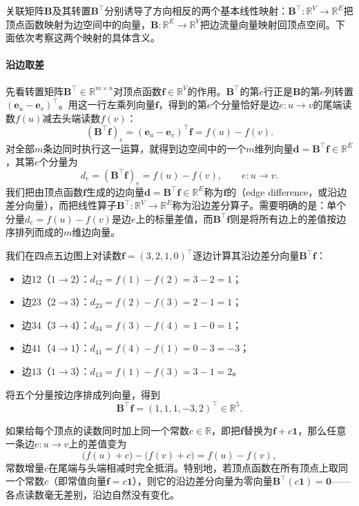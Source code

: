 关联矩阵$\bm{B}$及其转置$\bm{B}^\top$分别诱导了方向相反的两个基本线性映射：$\bm{B}^\top\colon\mathbb{R}^V\to\mathbb{R}^E$把顶点函数映射为边空间中的向量，$\bm{B}\colon\mathbb{R}^E\to\mathbb{R}^V$把边流量向量映射回顶点空间。下面依次考察这两个映射的具体含义。

\paragraph{沿边取差}

先看转置矩阵$\bm{B}^\top\in\mathbb{R}^{m\times n}$对顶点函数$\bm{f}\in\mathbb{R}^V$的作用。$\bm{B}^\top$的第$e$行正是$\bm{B}$的第$e$列转置$(\bm{e}_u-\bm{e}_v)^\top$。用这一行左乘列向量$\bm{f}$，得到的第$e$个分量恰好是边$e\colon u\to v$的尾端读数$f(u)$减去头端读数$f(v)$：
\[
(\bm{B}^\top\bm{f})_e=(\bm{e}_u-\bm{e}_v)^\top\bm{f}=f(u)-f(v).
\]
对全部$m$条边同时执行这一运算，就得到边空间中的一个$m$维列向量$\bm{d}=\bm{B}^\top\bm{f}\in\mathbb{R}^E$，其第$e$个分量为
\begin{equation}
d_e=(\bm{B}^\top\bm{f})_e=f(u)-f(v),\qquad e\colon u\to v.
\label{eq:incidence-edge-difference}
\end{equation}
我们把由顶点函数$\bm{f}$生成的边向量$\bm{d}=\bm{B}^\top\bm{f}\in\mathbb{R}^E$称为$\bm{f}$的（edge difference，或沿边差分向量），而把线性算子$\bm{B}^\top\colon\mathbb{R}^V\to\mathbb{R}^E$称为沿边差分算子。需要明确的是：单个分量$d_e=f(u)-f(v)$是边$e$上的标量差值，而$\bm{B}^\top\bm{f}$则是将所有边上的差值按边序排列而成的$m$维边向量。

我们在四点五边图上对读数$\bm{f}=(3,2,1,0)^\top$逐边计算其沿边差分向量$\bm{B}^\top\bm{f}$：
\begin{itemize}
\item 边$12$（$1\to2$）：$d_{12}=f(1)-f(2)=3-2=1$；
\item 边$23$（$2\to3$）：$d_{23}=f(2)-f(3)=2-1=1$；
\item 边$34$（$3\to4$）：$d_{34}=f(3)-f(4)=1-0=1$；
\item 边$41$（$4\to1$）：$d_{41}=f(4)-f(1)=0-3=-3$；
\item 边$13$（$1\to3$）：$d_{13}=f(1)-f(3)=3-1=2$。
\end{itemize}
将五个分量按边序排成列向量，得到
\[
\bm{B}^\top\bm{f}=(1,1,1,-3,2)^\top\in\mathbb{R}^5.
\]

如果给每个顶点的读数同时加上同一个常数$c\in\mathbb{R}$，即把$\bm{f}$替换为$\bm{f}+c\bm{1}$，那么任意一条边$e\colon u\to v$上的差值变为
\[
\bigl(f(u)+c\bigr)-\bigl(f(v)+c\bigr)=f(u)-f(v),
\]
常数增量$c$在尾端与头端相减时完全抵消。特别地，若顶点函数在所有顶点上取同一个常数$c$（即常值向量$\bm{f}=c\bm{1}$），则它的沿边差分向量为零向量$\bm{B}^\top(c\bm{1})=\bm{0}$——各点读数毫无差别，沿边自然没有变化。

